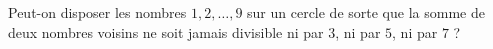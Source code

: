 Peut-on disposer les nombres $1, 2, \ldots, 9$ sur un cercle de sorte que la somme de deux nombres voisins ne soit jamais divisible ni par $3$, ni par $5$, ni par $7$ ?
